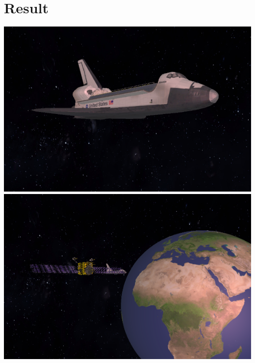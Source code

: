 \documentclass[12pt]{article}
\begin{document}
\section{Result}
\begin{center}
	\includegraphics[scale = 0.4]{result/4.png}
	\includegraphics[scale = 0.4]{result/2.png}
	

\end{center}
\end{document}
